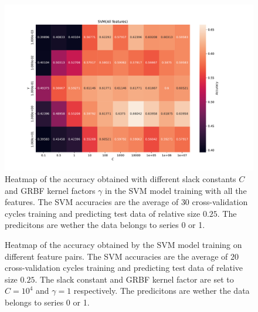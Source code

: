 \begin{figure}[H]
\centering
\includegraphics[width=1\textwidth]{Figures/accuracy(C,gamma)4}
\caption{Heatmap of the accuracy obtained with different slack constants $C$ and 
GRBF kernel factors $\gamma $ in the SVM model training with all the features. The SVM accuracies are the average of $30$ cross-validation 
cycles training and predicting test data of relative size $0.25$.
 The predicitons are wether the data belongs to series 0 or 1.}
\label{fig:Figures-accuracy-C-gamma-4}
\end{figure}

\begin{figure}[H]
\centering
{}
\caption{Heatmap of the accuracy obtained by the SVM model training on different feature pairs. The SVM accuracies are the average 
of $20$ cross-validation cycles training and predicting test data of relative size $0.25$.
The slack constant and GRBF kernel factor are set to $C=10^4$ and $\gamma=1 $ respectively. 
 The predicitons are wether the data belongs to series 0 or 1.}
\label{fig:Figures-feature_pairs4}
\end{figure}

